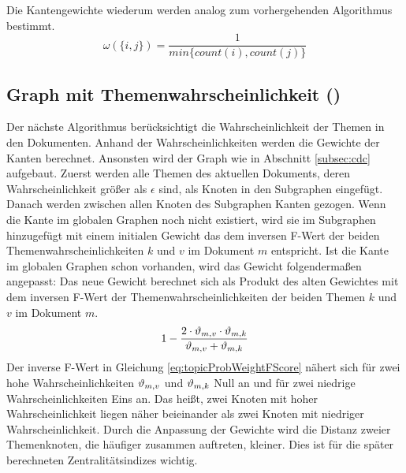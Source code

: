 Die Kantengewichte wiederum werden analog zum vorhergehenden Algorithmus bestimmt. 
 \[
 \omega(\{i,j\}) = \frac{1}{min \{count(i),count(j)\} } 
 \]


\subsection{Graph mit Themenwahrscheinlichkeit (\TPR)}
\label{subsec:tpr}

Der nächste Algorithmus berücksichtigt die Wahrscheinlichkeit der Themen in den Dokumenten. Anhand der Wahrscheinlichkeiten werden die Gewichte der Kanten berechnet. Ansonsten wird der Graph wie in Abschnitt \ref{subsec:cdc} aufgebaut. Zuerst werden alle Themen des aktuellen Dokuments, deren Wahrscheinlichkeit größer als $\epsilon$ sind, als Knoten in den Subgraphen eingefügt. Danach werden zwischen allen Knoten des Subgraphen Kanten gezogen. Wenn die Kante im globalen Graphen noch nicht existiert, wird sie im Subgraphen hinzugefügt mit einem initialen Gewicht das dem inversen F-Wert der beiden Themenwahrscheinlichkeiten $k$ und $v$ im Dokument $m$ entspricht. Ist die Kante im globalen Graphen schon vorhanden, wird das Gewicht folgendermaßen angepasst: Das neue Gewicht berechnet sich als Produkt des alten Gewichtes mit dem inversen F-Wert der Themenwahrscheinlichkeiten der beiden Themen $k$ und $v$ im Dokument $m$.
\begin{equation}
1 - \frac{2 \cdot \vartheta_{m,v} \cdot \vartheta_{m,k}}{\vartheta_{m,v} + \vartheta_{m,k}}
\label{eq:topicProbWeightFScore}
\end{equation}
Der inverse F-Wert in Gleichung \ref{eq:topicProbWeightFScore} nähert sich für zwei hohe Wahrscheinlichkeiten $\vartheta_{m,v}$ und $\vartheta_{m,k}$ Null an und für zwei niedrige Wahrscheinlichkeiten Eins an. Das heißt, zwei Knoten mit hoher Wahrscheinlichkeit liegen näher beieinander als zwei Knoten mit niedriger Wahrscheinlichkeit. Durch die Anpassung der Gewichte wird die Distanz zweier Themenknoten, die häufiger zusammen auftreten, kleiner. Dies ist für die später berechneten Zentralitätsindizes wichtig.


